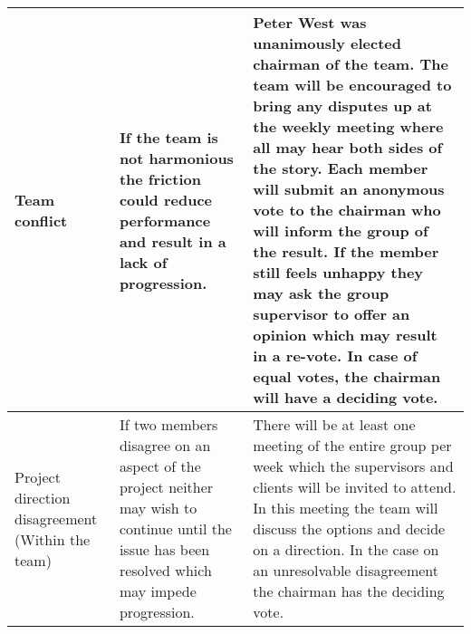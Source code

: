 \begin{center}
\begin{landscape}
\begin{longtable}{|p{3cm}|p{7cm}|p{12cm}|}
        Team conflict                                    & If the team is not harmonious the friction could reduce performance and result in a lack of progression.                                                                                                                                                                                                                                                                     & Peter West was unanimously elected chairman of the team. The team will be encouraged to bring any disputes up at the weekly meeting where all may hear both sides of the story. Each member will submit an anonymous vote to the chairman who will inform the group of the result. If the member still feels unhappy they may ask the group supervisor to offer an opinion which may result in a re-vote. In case of equal votes, the chairman will have a deciding vote.                                                                                                                                                                                                                                                                                                                                                                                                                                                                                                                                                                \\ \hline
        Project direction disagreement (Within the team) & If two members disagree on an aspect of the project neither may wish to continue until the issue has been resolved which may impede progression.                                                                                                                                                                                                                             & There will be at least one meeting of the entire group per week which the supervisors and clients will be invited to attend. In this meeting the team will discuss the options and decide on a direction. In the case on an unresolvable disagreement the chairman has the deciding vote.                                                                                                                                                                                                                                                                                                                                                                                                                                                                                                                                                                                                                                                                                                                                                \\ \hline

\end{longtable}
\end{landscape}
\end{center}
